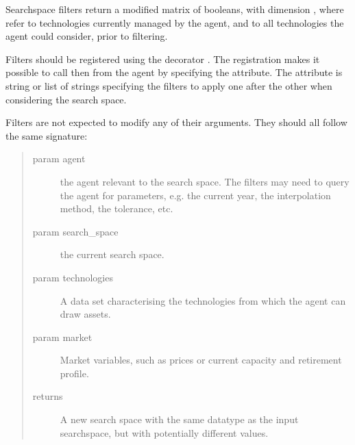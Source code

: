 \documentclass[letterpaper,10pt,english]{sphinxmanual}
\begin{document}
Search\sphinxhyphen{}space filters return a modified matrix of booleans, with dimension
, where  refer to technologies currently managed by
the agent, and  to all technologies the agent could consider, prior
to filtering.

Filters should be registered using the decorator . The
registration makes it possible to call then from the agent by specifying the
 attribute. The  attribute is string or list of
strings specifying the filters to apply one after the other when considering the
search space.

Filters are not expected to modify any of their arguments. They should all
follow the same signature:

\begin{sphinxVerbatim}[commandchars=\\\{\}]
 
     
     
     
     
  
\end{sphinxVerbatim}
\begin{quote}\begin{description}
\item[{param agent}] \leavevmode
the agent relevant to the search space. The filters may need to query
the agent for parameters, e.g. the current year, the interpolation
method, the tolerance, etc.

\item[{param search\_space}] \leavevmode
the current search space.

\item[{param technologies}] \leavevmode
A data set characterising the technologies from which the
agent can draw assets.

\item[{param market}] \leavevmode
Market variables, such as prices or current capacity and retirement
profile.

\item[{returns}] \leavevmode
A new search space with the same data\sphinxhyphen{}type as the input search\sphinxhyphen{}space, but
with potentially different values.

\end{description}\end{quote}
\end{document}

